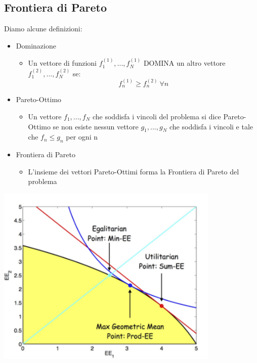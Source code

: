 \subsection{Frontiera di Pareto}
Diamo alcune definizioni:
\begin{itemize}
    \item Dominazione
\begin{itemize}
    \item Un vettore di funzioni $f_1^{(1)},...,f_N^{(1)}$ DOMINA un altro vettore $f_1^{(2)},...,f_N^{(2)}$ se:
\begin{equation*}
    f_n^{(1)} \geq f_n^{(2)} \ \forall n
\end{equation*}
\end{itemize}
    \item Pareto-Ottimo
    \begin{itemize}
        \item Un vettore $f_1,...,f_N$ che soddisfa i vincoli del problema si dice Pareto-Ottimo se non esiste nessun vettore $g_1,...,g_N$ che soddisfa i vincoli e tale che $f_n \leq g_n$ per ogni n
    \end{itemize}
    \item Frontiera di Pareto
    \begin{itemize}
        \item L'insieme dei vettori Pareto-Ottimi forma la Frontiera di Pareto del problema
    \end{itemize}
\end{itemize}
\begin{center}
    \includegraphics[width=0.8\textwidth]{Images/FrontieraPareto.png}
\end{center}